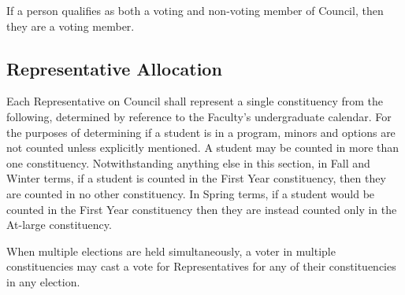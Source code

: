If a person qualifies as both a voting and non-voting member of Council, then
they are a voting member.

\subsection{Representative Allocation}
Each Representative on Council shall represent a single constituency from the
following, determined by reference to the Faculty's undergraduate calendar. For
the purposes of determining if a student is in a program, minors and options are
not counted unless explicitly mentioned. A student may be
counted in more than one constituency. Notwithstanding anything else in this
section, in Fall and Winter terms, if a student is counted in the First Year constituency, 
then they are counted in no other constituency. In Spring terms, if a student would be counted in the First Year constituency then they are instead counted only in the At-large constituency.

When multiple elections are held simultaneously, a voter in multiple
constituencies may cast a vote for Representatives for any of their constituencies in
any election.

